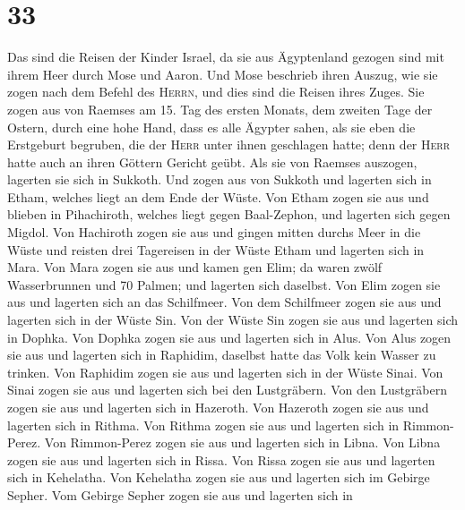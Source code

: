\hypertarget{section-32}{%
\section{33}\label{section-32}}

 Das sind die Reisen der Kinder Israel, da sie aus
Ägyptenland gezogen sind mit ihrem Heer durch Mose und Aaron.
 Und Mose beschrieb ihren Auszug, wie sie zogen nach dem
Befehl des \textsc{Herrn}, und dies sind die Reisen ihres Zuges.
 Sie zogen aus von Raemses am 15. Tag des ersten Monats,
dem zweiten Tage der Ostern, durch eine hohe Hand, dass es alle Ägypter
sahen,  als sie eben die Erstgeburt begruben, die der
\textsc{Herr} unter ihnen geschlagen hatte; denn der \textsc{Herr} hatte
auch an ihren Göttern Gericht geübt.  Als sie von Raemses
auszogen, lagerten sie sich in Sukkoth.  Und zogen aus von
Sukkoth und lagerten sich in Etham, welches liegt an dem Ende der Wüste.
 Von Etham zogen sie aus und blieben in Pihachiroth,
welches liegt gegen Baal-Zephon, und lagerten sich gegen Migdol.
 Von Hachiroth zogen sie aus und gingen mitten durchs Meer
in die Wüste und reisten drei Tagereisen in der Wüste Etham und lagerten
sich in Mara.  Von Mara zogen sie aus und kamen gen Elim;
da waren zwölf Wasserbrunnen und 70 Palmen; und lagerten sich daselbst.
 Von Elim zogen sie aus und lagerten sich an das
Schilfmeer.  Von dem Schilfmeer zogen sie aus und
lagerten sich in der Wüste Sin.  Von der Wüste Sin zogen
sie aus und lagerten sich in Dophka.  Von Dophka zogen
sie aus und lagerten sich in Alus.  Von Alus zogen sie
aus und lagerten sich in Raphidim, daselbst hatte das Volk kein Wasser
zu trinken.  Von Raphidim zogen sie aus und lagerten sich
in der Wüste Sinai.  Von Sinai zogen sie aus und lagerten
sich bei den Lustgräbern.  Von den Lustgräbern zogen sie
aus und lagerten sich in Hazeroth.  Von Hazeroth zogen
sie aus und lagerten sich in Rithma.  Von Rithma zogen
sie aus und lagerten sich in Rimmon-Perez.  Von
Rimmon-Perez zogen sie aus und lagerten sich in Libna. 
Von Libna zogen sie aus und lagerten sich in Rissa.  Von
Rissa zogen sie aus und lagerten sich in Kehelatha.  Von
Kehelatha zogen sie aus und lagerten sich im Gebirge Sepher.
 Vom Gebirge Sepher zogen sie aus und lagerten sich in
